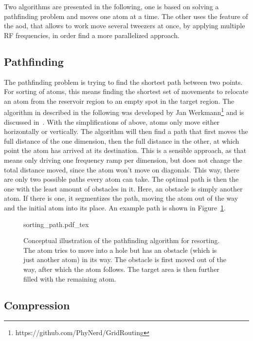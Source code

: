 Two algorithms are presented in the following, one is based on solving a pathfinding problem and moves one atom at a time. The other uses the feature of the \ac{aod}, that allows to work move several tweezers at once, by applying multiple RF frequencies, in order find a more parallelized approach.


\subsection{Pathfinding}

The pathfinding problem is trying to find the shortest path between two points. For sorting of atoms, this means finding the shortest set of movements to relocate an atom from the reservoir region to an empty spot in the target region.
The algorithm in described in the following was developed by Jan Werkmann\footnote{https://github.com/PhyNerd/GridRouting} and is discussed in~\cite{OhldeMello2020}. With the simplifications of above, atoms only move either horizontally or vertically. The algorithm will then find a path that first moves the full distance of the one dimension, then the full distance in the other, at which point the atom has arrived at its destination. This is a sensible approach, as that means only driving one frequency ramp per dimension, but does not change the total distance moved, since the atom won't move on diagonals.
This way, there are only two possible paths every atom can take. The optimal path is then the one with the least amount of obstacles in it. Here, an obstacle is simply another atom. If there is one, it segmentizes the path, moving the atom out of the way and the initial atom into its place. An example path is shown in Figure~\ref{fig:sorting_path}.

\begin{figure}[ht]%
\centering
{sorting_path.pdf_tex}
\caption{Conceptual illustration of the pathfinding algorithm for resorting. The atom tries to move into a hole but has an obstacle (which is just another atom) in its way. The obstacle is first moved out of the way, after which the atom follows. The target area is then further filled with the remaining atom.}%
\label{fig:sorting_path}
\end{figure}

\subsection{Compression}%
\label{sec:compression}

